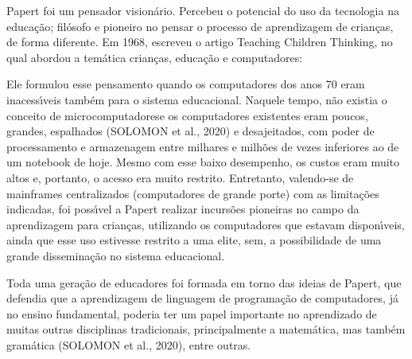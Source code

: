 \documentclass[
12pt,		%
openright,	%
twoside,  %
a4paper,			%
chapter=TITLE,		%
english,			%
french,				%
spanish,			%
brazil				%
]{USPSC-classe/USPSC}
\begin{document}
Papert foi um pensador vision\'ario. Percebeu o potencial do uso da tecnologia na educa\c{c}\~ao; fil\'osofo e pioneiro no pensar o processo de aprendizagem de crian\c{c}as, de forma diferente. Em 1968, escreveu o artigo \textquotedbl Teaching Children Thinking\textquotedbl , no qual abordou a tem\'atica crian\c{c}as, educa\c{c}\~ao e computadores:











\noindent\begin{center}\mbox{\centering{}}\end{center}


Ele formulou esse pensamento quando os computadores dos anos 70 eram inacess\'{\i}veis tamb\'em para o sistema educacional. Naquele tempo, n\~ao existia o conceito de \textquotedbl microcomputadores\textquotedbl  e os computadores existentes eram poucos, grandes, espalhados  (SOLOMON et al., 2020) e desajeitados, com poder de processamento e armazenagem entre milhares e milh\~oes de vezes inferiores ao de um notebook de hoje. Mesmo com esse baixo desempenho, os custos eram muito altos e, portanto, o acesso era muito restrito. Entretanto, valendo-se de mainframes centralizados (computadores de grande porte) com as limita\c{c}\~oes indicadas, foi poss\'{\i}vel a Papert realizar incurs\~oes pioneiras no campo da aprendizagem para crian\c{c}as, utilizando os computadores que estavam dispon\'{\i}veis, ainda que esse uso estivesse restrito a uma elite, sem, a possibilidade de uma grande dissemina\c{c}\~ao no sistema educacional.










Toda uma gera\c{c}\~ao de educadores foi formada em torno das ideias de Papert, que defendia que a aprendizagem de linguagem de programa\c{c}\~ao de computadores, j\'a no ensino fundamental, poderia ter um papel importante no aprendizado de muitas outras disciplinas tradicionais, principalmente a matem\'atica, mas tamb\'em gram\'atica (SOLOMON et al., 2020), entre outras.
\end{document}
